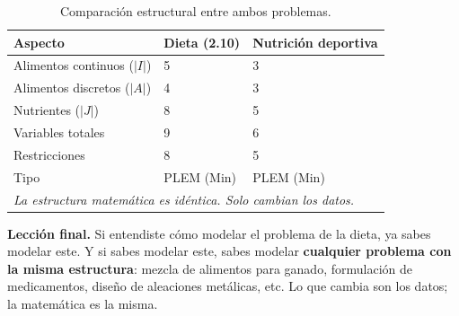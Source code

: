 \documentclass[12pt]{article}
\begin{document}
\begin{table}[h]
\centering
\small
\begin{tabular}{lll}
\toprule
\textbf{Aspecto} & \textbf{Dieta (2.10)} & \textbf{Nutrici\'on deportiva} \\
\midrule
Alimentos continuos ($|I|$) & 5 & 3 \\
Alimentos discretos ($|A|$) & 4 & 3 \\
Nutrientes ($|J|$) & 8 & 5 \\
Variables totales & 9 & 6 \\
Restricciones & 8 & 5 \\
Tipo & PLEM (Min) & PLEM (Min) \\
\midrule
\multicolumn{3}{l}{\textit{La estructura matem\'atica es id\'entica. Solo cambian los datos.}} \\
\bottomrule
\end{tabular}
\caption{Comparaci\'on estructural entre ambos problemas.}
\end{table}

\begin{cajaverde}
\textbf{Lecci\'on final.} Si entendiste c\'omo modelar el problema de la dieta, ya sabes modelar este. Y si sabes modelar este, sabes modelar \textbf{cualquier problema con la misma estructura}: mezcla de alimentos para ganado, formulaci\'on de medicamentos, dise\~no de aleaciones met\'alicas, etc. Lo que cambia son los datos; la matem\'atica es la misma.
\end{cajaverde}
\end{document}
